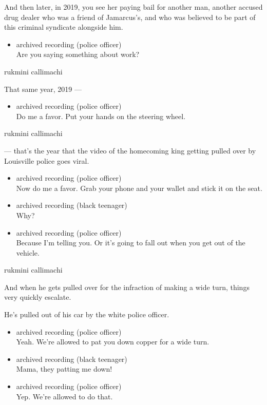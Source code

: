 And then later, in 2019, you see her paying bail for another man,
another accused drug dealer who was a friend of Jamarcus's, and who was
believed to be part of this criminal syndicate alongside him.

\begin{itemize}
\tightlist
\item
  archived recording (police officer)\\
  Are you saying something about work?
\end{itemize}

rukmini callimachi

That same year, 2019 ---

\begin{itemize}
\tightlist
\item
  archived recording (police officer)\\
  Do me a favor. Put your hands on the steering wheel.
\end{itemize}

rukmini callimachi

--- that's the year that the video of the homecoming king getting pulled
over by Louisville police goes viral.

\begin{itemize}
\item
  archived recording (police officer)\\
  Now do me a favor. Grab your phone and your wallet and stick it on the
  seat.
\item
  archived recording (black teenager)\\
  Why?
\item
  archived recording (police officer)\\
  Because I'm telling you. Or it's going to fall out when you get out of
  the vehicle.
\end{itemize}

rukmini callimachi

And when he gets pulled over for the infraction of making a wide turn,
things very quickly escalate.

He's pulled out of his car by the white police officer.

\begin{itemize}
\item
  archived recording (police officer)\\
  Yeah. We're allowed to pat you down copper for a wide turn.
\item
  archived recording (black teenager)\\
  Mama, they patting me down!
\item
  archived recording (police officer)\\
  Yep. We're allowed to do that.
\end{itemize}

